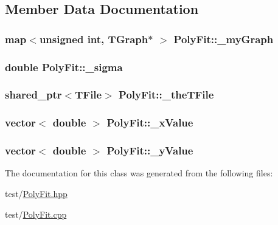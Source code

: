 \subsection{Member Data Documentation}
\hypertarget{classPolyFit_ae3de4c7d4cda8ce2cf162d9d70631cba}{
\subsubsection[{\_\-myGraph}]{\setlength{\rightskip}{0pt plus 5cm}map$<$unsigned int, TGraph$\ast$ $>$ {\bf PolyFit::\_\-myGraph}}}
\label{de/d89/classPolyFit_ae3de4c7d4cda8ce2cf162d9d70631cba}
\hypertarget{classPolyFit_a0a19ea869319d65f97de4d0bc95e8061}{
\subsubsection[{\_\-sigma}]{\setlength{\rightskip}{0pt plus 5cm}double {\bf PolyFit::\_\-sigma}}}
\label{de/d89/classPolyFit_a0a19ea869319d65f97de4d0bc95e8061}
\hypertarget{classPolyFit_a9905a65c08ba059c98a0e4cf14dc1752}{
\subsubsection[{\_\-theTFile}]{\setlength{\rightskip}{0pt plus 5cm}shared\_\-ptr$<$TFile$>$ {\bf PolyFit::\_\-theTFile}}}
\label{de/d89/classPolyFit_a9905a65c08ba059c98a0e4cf14dc1752}
\hypertarget{classPolyFit_a0092a72e38616b0541f5ca2d3e109397}{
\subsubsection[{\_\-xValue}]{\setlength{\rightskip}{0pt plus 5cm}vector$<$ double $>$ {\bf PolyFit::\_\-xValue}}}
\label{de/d89/classPolyFit_a0092a72e38616b0541f5ca2d3e109397}
\hypertarget{classPolyFit_a29d10890ebfda2ec6f0e7697dca5258f}{
\subsubsection[{\_\-yValue}]{\setlength{\rightskip}{0pt plus 5cm}vector$<$ double $>$ {\bf PolyFit::\_\-yValue}}}
\label{de/d89/classPolyFit_a29d10890ebfda2ec6f0e7697dca5258f}


The documentation for this class was generated from the following files:\begin{DoxyCompactItemize}
\item 
test/\hyperlink{PolyFit_8hpp}{PolyFit.hpp}\item 
test/\hyperlink{PolyFit_8cpp}{PolyFit.cpp}\end{DoxyCompactItemize}
